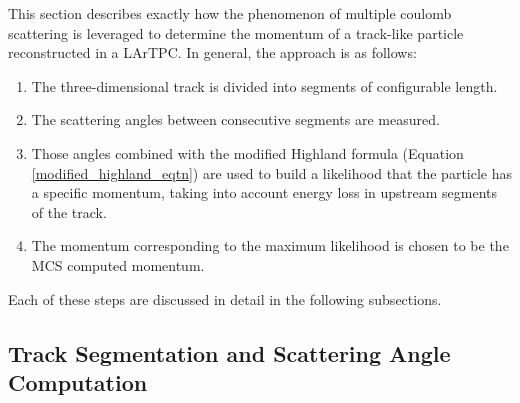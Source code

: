 \documentclass[a4paper,11pt]{article}
\begin{document}
This section describes exactly how the phenomenon of multiple coulomb scattering is leveraged to determine the momentum of a track-like particle reconstructed in a LArTPC. In general, the approach is as follows:
\begin{enumerate}
\item The three-dimensional track is divided into segments of configurable length.
\item The scattering angles between consecutive segments are measured.
\item Those angles combined with the modified Highland formula (Equation \ref{modified_highland_eqtn}) are used to build a likelihood that the particle has a specific momentum, taking into account energy loss in upstream segments of the track.
\item The momentum corresponding to the maximum likelihood is chosen to be the MCS computed momentum.
\end{enumerate}
Each of these steps are discussed in detail in the following subsections.\\














\subsection{Track Segmentation and Scattering Angle Computation}\label{track_segmentation_and_scattering_angle_computation_section}
\end{document}
